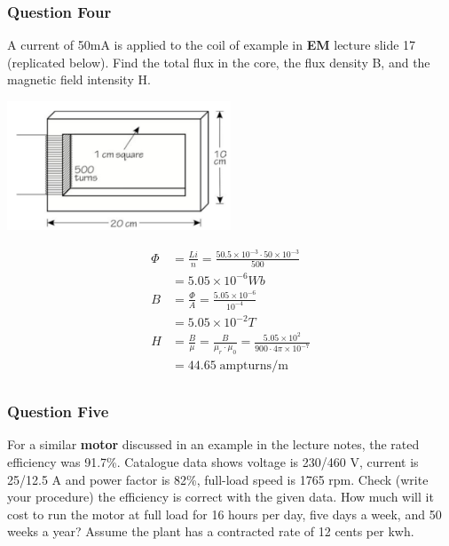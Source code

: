 \documentclass[a4paper,11pt]{article}
\begin{document}
\subsubsection*{Question Four}
A current of 50mA is applied to the coil of example in \textbf{EM} lecture slide 17 (replicated below). Find the total flux in the core, the flux density B, and the magnetic field intensity H.

\begin{center}
    \includegraphics[width=0.5\textwidth]{core.png}
\end{center}

\begin{align*}
    \Phi & = \frac{Li}{n} = \frac{50.5\times10^{-3} \cdot 50 \times 10^{-3}}{500}                                \\&= 5.05\times10^{-6}Wb\\
    B    & = \frac{\Phi}{A} = \frac{5.05\times10^{-6}}{10^{-4}}                                                  \\
         & = 5.05\times10^{-2}T                                                                                  \\
    H    & = \frac{B}{\mu} = \frac{B}{\mu_r \cdot \mu_0} = \frac{5.05\times10^{2}}{900 \cdot 4\pi\times 10^{-7}} \\
         & = 44.65 \; \mathrm{ampturns/m}                                                                        \\
\end{align*}

\subsubsection*{Question Five}
For a similar \textbf{motor} discussed in an example in the lecture notes, the rated efficiency was 91.7\%. Catalogue data shows voltage is 230/460 V, current is 25/12.5 A and power factor is 82\%, full-load speed is 1765 rpm. Check (write your procedure) the efficiency is correct with the given data. How much will it cost to run the motor at full load for 16 hours per day, five days a week, and 50 weeks a year? Assume the plant has a contracted rate of 12 cents per kwh.
\end{document}
